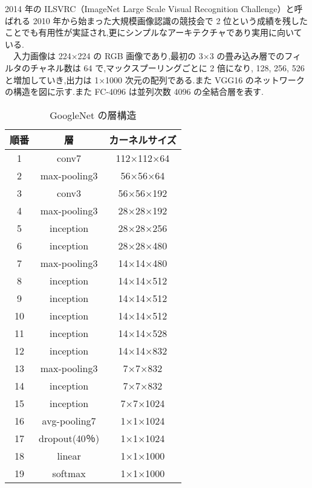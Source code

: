  2014 年の ILSVRC（ImageNet Large Scale Visual Recognition Challenge）と呼ばれる 2010 年から始まった大規模画像認識の競技会で 2 位という成績を残したことでも有用性が実証され,更にシンプルなアーキテクチャであり実用に向いている.\\
　入力画像は 224×224 の RGB 画像であり,最初の 3×3 の畳み込み層でのフィルタのチャネル数は 64 で,マックスプーリングごとに 2 倍になり, 128, 256, 526と増加していき,出力は 1×1000 次元の配列である.また VGG16 のネットワークの構造を図に示す.また FC-4096 は並列次数 4096 の全結合層を表す.
\begin{table}[!t]
  \begin{center}
  \caption{GoogleNet の層構造}
  \begin{tabular}{|c|c|c|} \hline
    順番 & 層 & カーネルサイズ \\ \hline
    1 & conv7 & 112×112×64 \\ \hline
    2 & max-pooling3 & 56×56×64 \\ \hline
    3 & conv3 & 56×56×192 \\ \hline
    4 & max-pooling3 & 28×28×192 \\ \hline
    5 & inception & 28×28×256 \\ \hline
    6 & inception & 28×28×480 \\ \hline
    7 & max-pooling3 & 14×14×480 \\ \hline
    8 & inception & 14×14×512 \\ \hline
    9 & inception & 14×14×512 \\ \hline
    10 & inception & 14×14×512 \\ \hline
    11 & inception & 14×14×528 \\ \hline
    12 & inception & 14×14×832 \\ \hline
    13 & max-pooling3 & 7×7×832 \\ \hline
    14 & inception & 7×7×832 \\ \hline
    15 & inception & 7×7×1024 \\ \hline
    16 & avg-pooling7 & 1×1×1024 \\ \hline
    17 & dropout(40$％$) & 1×1×1024 \\ \hline
    18 & linear & 1×1×1000 \\ \hline
    19 & softmax & 1×1×1000 \\ \hline
  \end{tabular}
  \end{center}
\end{table}
